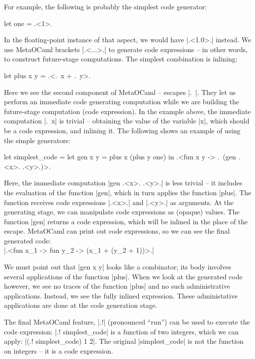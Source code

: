 \documentclass{llncs}
\begin{document}
For example, the following is probably the simplest code generator:
\begin{code}
let one = .<1>.
\end{code}

In the floating-point instance of that aspect, we would have
|.<1.0>.| instead. We use MetaOCaml brackets |.<...>.| to generate
code expressions -- in other words, to construct future-stage
computations. The simplest combination is inlining:
\begin{code}
let plus x y = .<.~x + .~y>.
\end{code}
Here we see the second component of MetaOCaml -- escapes |.~|. They
let us perform an immediate code generating computation while we are
building the future-stage computation (code expression). In the
example above, the immediate computation |.~x| is trivial -- obtaining
the value of the variable |x|, which should be a code expression, and
inlining it. The following shows an example of using the simple
generators:

\begin{code}
let simplest_code =
  let gen x y = plus x (plus y one) in
  .<fun x y -> .~(gen .<x>. .<y>.)>.
\end{code}

Here, the immediate computation |gen .<x>. .<y>.| is less trivial --
it includes the evaluation of the function |gen|, which in turn
applies the function |plus|. The function receives code expressions
|.<x>.| and |.<y>.| as arguments. At the generating stage, we can
manipulate code expressions as (opaque) values. The function |gen| returns a
code expression, which will be inlined in the place of the
escape. MetaOCaml can print out code expressions, so we can see the
final generated code:\\
  |.<fun x_1 -> fun y_2 -> (x_1 + (y_2 + 1))>.|

We must point out that |gen x y| looks like a combinator; its body 
involves several applications of the function |plus|. When
we look at the generated code however, we see no traces of the function
|plus| and no such administrative applications. Instead, we see the
fully inlined expression. These administative applications are done at
the code generation stage. 

The final MetaOCaml feature, |.!| (pronounced ``run'') can be used to
execute the code expression: |.! simplest_code| is a function of two
integers, which we can apply: |(.! simplest_code) 1 2|. The original
|simplest_code| is not the function on integers -- it is a code
expression.
\end{document}
